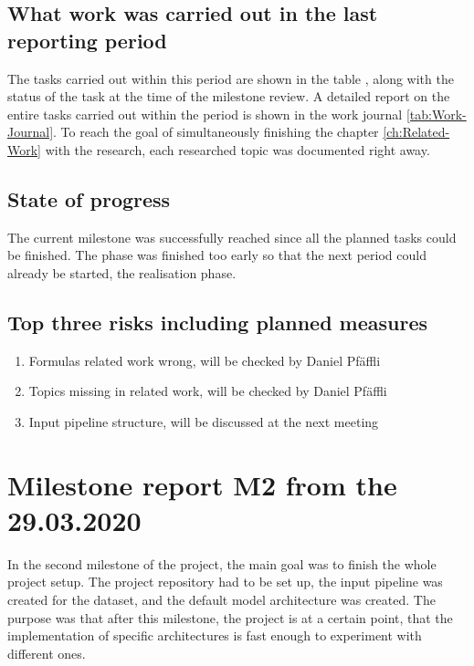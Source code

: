 \subsection{What work was carried out in the last reporting period}
The tasks carried out within this period are shown in the table , along with the status of the task at the time of the milestone review. A detailed report on the entire tasks carried out within the period is shown in the work journal \ref{tab:Work-Journal}. To reach the goal of simultaneously finishing the chapter \ref{ch:Related-Work} with the research, each researched topic was documented right away. 

\subsection{State of progress}
The current milestone was successfully reached since all the planned tasks could be finished. The phase was finished too early so that the next period could already be started, the realisation phase. 

\subsection{Top three risks including planned measures}
\begin{enumerate}
    \setlength\itemsep{0em}
    \item Formulas related work wrong, will be checked by Daniel Pfäffli
    \item Topics missing in related work, will be checked by Daniel Pfäffli
    \item Input pipeline structure, will be discussed at the next meeting
\end{enumerate}

\section{Milestone report M2 from the 29.03.2020}
In the second milestone of the project, the main goal was to finish the whole project setup. The project repository had to be set up, the input pipeline was created for the dataset, and the default model architecture was created. The purpose was that after this milestone, the project is at a certain point, that the implementation of specific architectures is fast enough to experiment with different ones.

